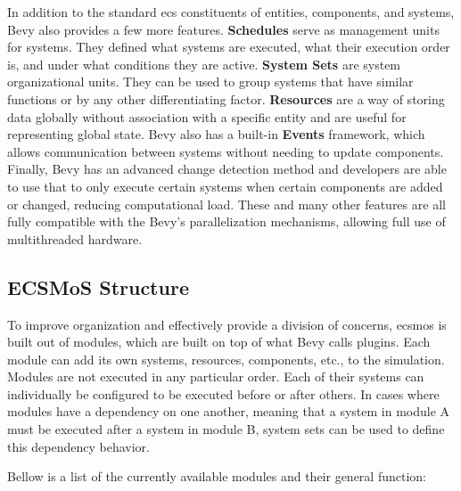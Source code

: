 \documentclass[twoside, 11pt]{article}
\begin{document}
In addition to the standard \gls{ecs} constituents of entities, components, and systems, Bevy also provides a few more features. \textbf{Schedules} serve as management units for systems. They defined what systems are executed, what their execution order is, and under what conditions they are active. \textbf{System Sets} are system organizational units. They can be used to group systems that have similar functions or by any other differentiating factor. \textbf{Resources} are a way of storing data globally without association with a specific entity and are useful for representing global state. Bevy also has a built-in \textbf{Events} framework, which allows communication between systems without needing to update components. Finally, Bevy has an advanced change detection method and developers are able to use that to only execute certain systems when certain components are added or changed, reducing computational load. These and many other features are all fully compatible with the Bevy's parallelization mechanisms, allowing full use of multithreaded hardware.

\subsection{ECSMoS Structure}

To improve organization and effectively provide a division of concerns, \gls{ecsmos} is built out of modules, which are built on top of what Bevy calls plugins. Each module can add its own systems, resources, components, etc., to the simulation. Modules are not executed in any particular order. Each of their systems can individually be configured to be executed before or after others. In cases where modules have a dependency on one another, meaning that a system in module A must be executed after a system in module B, system sets can be used to define this dependency behavior.

Bellow is a list of the currently available modules and their general function:
\end{document}
